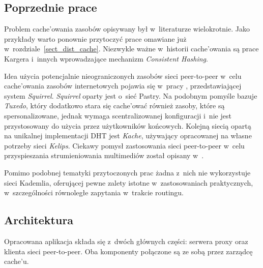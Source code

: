 \documentclass[a4paper,11pt]{scrartcl}
\newcommand{\s}{ }
\newcommand{\keszu}{cache'u}
\newcommand{\keszowac}{cache'ować}
\newcommand{\keszowania}{cache'owania}
\begin{document}
\subsection{Poprzednie prace}
\label{sect_previous_work}
Problem \keszowania\s zasobów opisywany był w~literaturze wielokrotnie. Jako przykłady warto ponownie przytoczyć prace \cite{malpani1995making, chankhunthod1995hierarchical, povey1997distributed} omawiane już w~rozdziale~\ref{sect_dist_cache}. Niezwykle ważne w~historii \keszowania\s są prace Kargera i~innych \cite{karger1997consistent, karger1999web} wprowadzające mechanizm \textit{Consistent Hashing}.

Idea użycia potencjalnie nieograniczonych zasobów sieci peer-to-peer w~celu \keszowania\s zasobów internetowych pojawia się w~pracy \cite{iyer2002squirrel, clevenot2004simple}, przedstawiającej system \textit{Squirrel}. \textit{Squirrel} oparty jest o~sieć Pastry\cite{rowstron2001pastry}. 
Na podobnym pomyśle bazuje \textit{Tuxedo}\cite{shi2003tuxedo}, który dodatkowo stara się \keszowac\s również zasoby, które są spersonalizowane, jednak wymaga scentralizowanej konfiguracji i~nie jest przystosowany do użycia przez użytkowników końcowych. 
Kolejną siecią opartą na unikalnej implementacji DHT jest \textit{Kache}\cite{linga2004kache}, używający opracowanej na własne potrzeby sieci \textit{Kelips}.
Ciekawy pomysł zastosowania sieci peer-to-peer w~celu przyspieszania strumieniowania multimediów został opisany w~\cite{guo2006design}.

Pomimo podobnej tematyki przytoczonych prac żadna z~nich nie wykorzystuje sieci Kademlia, oferującej pewne zalety istotne w~zastosowaniach praktycznych, w~szczególności równoległe zapytania w~trakcie routingu.

\subsection{Architektura}
\label{sect_architecture}
Opracowana aplikacja składa się z~dwóch głównych części: serwera proxy oraz klienta sieci peer-to-peer. Oba komponenty połączone są ze sobą przez zarządcę \keszu.
\end{document}
